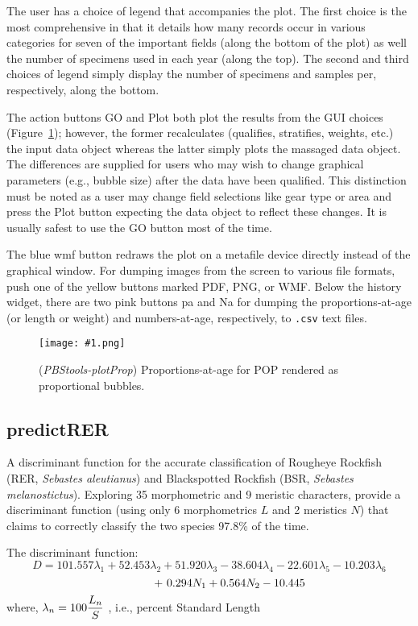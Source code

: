 \documentclass[letterpaper,12pt,fleqn]{article}
\def\tab{\hspace{0.5 in}}
\newcommand{\code}[1]{\small\texttt{#1}\normalsize}
\newcommand{\eqn}[1]{\begin{equation}#1\end{equation}}
\newcommand{\gfrac}[2]{\genfrac{}{}{}{0}{#1}{#2}}
\newcommand{\gui}[1]{\small\textmd{\textsf{#1}}\normalsize}
\newcommand\pbsfig[4]{    %
	\begin{figure}[ht!] %
	\centering
	\texttt{[image: \#1.png]}
	\ifthenelse{\isempty{#4}}
		{\caption[#2]{(\emph{#1}) #2}\vspace{-2ex}}
		{\caption[#4]{(\emph{#1}) #2}\vspace{-2ex}}
	\label{fig:#1}
	\end{figure}
}
\begin{document}
\tab The user has a choice of legend that accompanies the plot. The first choice is the most comprehensive in that it details how many records occur in various categories for seven of the important fields (along the bottom of the plot) as well the number of specimens used in each year (along the top). The second and third choices of legend simply display the number of specimens and samples per, respectively, along the bottom.

\tab The action buttons \gui{GO} and \gui{Plot} both plot the results from the GUI choices (Figure~\ref{fig:PBStools-plotProp}); however, the former recalculates (qualifies, stratifies, weights, etc.) the input data object whereas the latter simply plots the massaged data object. The differences are supplied for users who may wish to change graphical parameters (e.g., bubble size) after the data have been qualified. This distinction must be noted as a user may change field selections like gear type or area and press the \gui{Plot} button expecting the data object to reflect these changes. It is usually safest to use the \gui{GO} button most of the time. 

\tab The blue \gui{wmf} button redraws the plot on a metafile device directly instead of the graphical window. For dumping images from the screen to various file formats, push one of the yellow buttons marked \gui{PDF}, \gui{PNG}, or \gui{WMF}. Below the history widget, there are two pink buttons \gui{pa} and \gui{Na} for dumping the proportions-at-age (or length or weight) and numbers-at-age, respectively, to \code{.csv} text files.

\pbsfig{PBStools-plotProp}{Proportions-at-age for POP rendered as proportional bubbles.}{4.0}{Bubble plot showing proportions-at-age for POP}

\subsection {predictRER}

\tab A discriminant function for the accurate classification of Rougheye Rockfish (RER, \emph{Sebastes aleutianus}) and Blackspotted Rockfish (BSR, \emph{Sebastes melanostictus}).
Exploring 35 morphometric and 9 meristic characters, \citet{Orr-Hawkins:2008} provide a discriminant function (using only 6 morphometrics $L$ and 2 meristics $N$) 
 that claims to correctly classify the two species 97.8\% of the time.

The discriminant function:
\eqn{D = 101.557 \lambda_1 + 52.453 \lambda_2 + 51.920 \lambda_3 - 38.604 \lambda_4 - 22.601 \lambda_5 - 10.203 \lambda_6 \nonumber }
\vspace*{-6ex}
\eqn{\tab +~0.294 N_1 + 0.564 N_2 - 10.445 }
where, $\lambda_n = 100 \gfrac{L_n}{S}$ , i.e., percent Standard Length 
\end{document}
